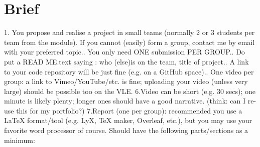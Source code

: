 \section*{Brief}
1. You propose and realise a project in small teams (normally 2 or 3 students per team from the module). If you cannot (easily) form a group, contact me by email with your preferred topic.\newline {}. You only need ONE submission PER GROUP.\newline {}. Do put a READ ME.text saying : who (else)is on the team, title of project.\newline {}. A link to your code repository will be just fine (e.g. on a GitHub space).\newline {}. One video per group: a link to Vimeo/YouTube/etc. is fine; uploading your video (unless very large) should be possible too on the VLE.\newline \newline
6.Video can be short (e.g. 30 secs); one minute is likely plenty; longer ones should have a good narrative. (think: can I re-use this for my portfolio?)\newline \newline
7.Report (one per group): recommended you use a LaTeX format/tool (e.g. LyX, TeX maker, Overleaf, etc.), but you may use your favorite word processor of course. Should have the following parts/sections as a minimum:\newline \newline

